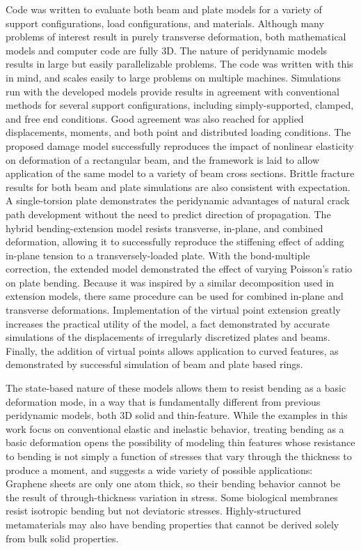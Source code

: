 Code was written to evaluate both beam and plate models for a variety of support configurations, load configurations, and materials.
Although many problems of interest result in purely transverse deformation, both mathematical models and computer code are fully 3D.
The nature of peridynamic models results in large but easily parallelizable problems.
The code was written with this in mind, and scales easily to large problems on multiple machines.
Simulations run with the developed models provide results in agreement with conventional methods for several support configurations, including simply-supported, clamped, and free end conditions.
Good agreement was also reached for applied displacements, moments, and both point and distributed loading conditions.
The proposed damage model successfully reproduces the impact of nonlinear elasticity on deformation of a rectangular beam, and the framework is laid to allow application of the same model to a variety of beam cross sections.
Brittle fracture results for both beam and plate simulations are also consistent with expectation.
A single-torsion plate demonstrates the peridynamic advantages of natural crack path development without the need to predict direction of propagation.
The hybrid bending-extension model resists transverse, in-plane, and combined deformation, allowing it to successfully reproduce the stiffening effect of adding in-plane tension to a transversely-loaded plate.
With the bond-multiple correction, the extended model demonstrated the effect of varying Poisson's ratio on plate bending.
Because it was inspired by a similar decomposition used in extension models, there same procedure can be used for combined in-plane and transverse deformations.
Implementation of the virtual point extension greatly increases the practical utility of the model, a fact demonstrated by accurate simulations of the displacements of irregularly discretized plates and beams.
Finally, the addition of virtual points allows application to curved features, as demonstrated by successful simulation of beam and plate based rings.

The state-based nature of these models allows them to resist bending as a basic deformation mode, in a way that is fundamentally different from previous peridynamic models, both 3D solid and thin-feature.
While the examples in this work focus on conventional elastic and inelastic behavior, treating bending as a basic deformation opens the possibility of modeling thin features whose resistance to bending is not simply a function of stresses that vary through the thickness to produce a moment, and suggests a wide variety of possible applications: 
Graphene sheets are only one atom thick, so their bending behavior cannot be the result of through-thickness variation in stress. 
Some biological membranes resist isotropic bending but not deviatoric stresses.
Highly-structured metamaterials may also have bending properties that cannot be derived solely from bulk solid properties.

